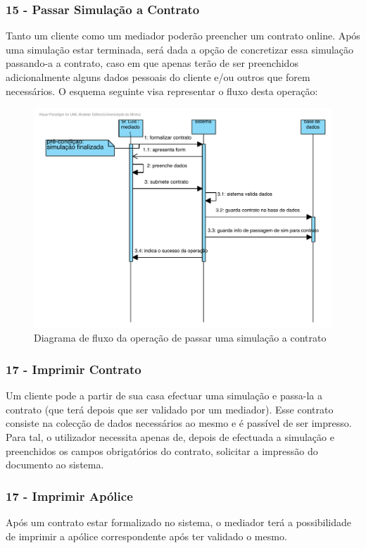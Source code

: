 \subsubsection{\textbf{15 - Passar Simulação a Contrato}}
Tanto um cliente como um mediador poderão preencher um contrato online. Após uma simulação estar terminada, será dada a opção de concretizar essa simulação passando-a a contrato, caso em que apenas terão de ser preenchidos adicionalmente alguns dados pessoais do cliente e/ou outros que forem necessários. O esquema seguinte visa representar o fluxo desta operação:
\pagebreak
\begin{figure}[!htb]
	\centering
	\includegraphics[scale=0.75]{images/efectuarContrato}
	\caption {Diagrama de fluxo da operação de passar uma simulação a contrato}
\end{figure}

\subsubsection{\textbf{17 - Imprimir Contrato}}
Um cliente pode a partir de sua casa efectuar uma simulação e passa-la a contrato (que terá depois que ser validado por um mediador). Esse contrato consiste na colecção de dados necessários ao mesmo e é passível de ser impresso. Para tal, o utilizador necessita apenas de, depois de efectuada a simulação e preenchidos os campos obrigatórios do contrato, solicitar a impressão do documento ao sistema.

\subsubsection{\textbf{17 - Imprimir Apólice}}
Após um contrato estar formalizado no sistema, o mediador terá a possibilidade de imprimir a apólice correspondente após ter validado o mesmo.


